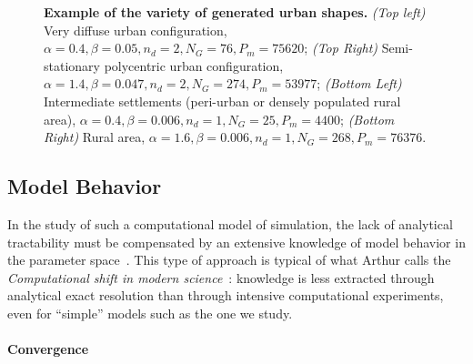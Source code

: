 \documentclass[10pt,letterpaper]{article}
\begin{document}
\begin{figure}
\caption{\textbf{Example of the variety of generated urban shapes.} \textit{(Top left)} Very diffuse urban configuration, $\alpha = 0.4,\beta = 0.05, n_d = 2, N_G = 76, P_m = 75620$; \textit{(Top Right)} Semi-stationary polycentric urban configuration, $\alpha = 1.4,\beta = 0.047, n_d = 2, N_G = 274, P_m = 53977$; \textit{(Bottom Left)} Intermediate settlements (peri-urban or densely populated rural area), $\alpha = 0.4,\beta = 0.006, n_d = 1, N_G = 25, P_m = 4400$; \textit{(Bottom Right)} Rural area, $\alpha = 1.6,\beta = 0.006, n_d = 1, N_G = 268, P_m = 76376$.}
\label{fig:fig2}
\end{figure}




\subsection*{Model Behavior}


In the study of such a computational model of simulation, the lack of analytical tractability must be compensated by an extensive knowledge of model behavior in the parameter space~\cite{banos2013pour}. This type of approach is typical of what Arthur calls the \emph{Computational shift in modern science}~\cite{arthur2015complexity}: knowledge is less extracted through analytical exact resolution than through intensive computational experiments, even for ``simple'' models such as the one we study.


\paragraph{Convergence}
\end{document}
